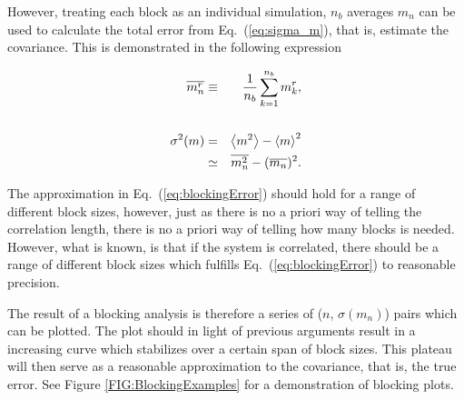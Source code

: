 However, treating each block as an individual simulation, $n_b$ averages $m_n$ can be used to calculate the total error from Eq.~(\ref{eq:sigma_m}), that is, estimate the covariance. This is demonstrated in the following expression

\begin{eqnarray}
  \overline{m_n^r} &\equiv& \frac{1}{n_b}\sum_{k=1}^{n_b} m_k^r, \\
\nonumber\\
  \sigma^2(m) &=& \left< m^2 \right> - \left< m \right>^2 \nonumber\\
              &\simeq& \overline{m_n^2} - (\overline{m_n})^2. \label{eq:blockingError}
\end{eqnarray}

The approximation in Eq.~(\ref{eq:blockingError}) should hold for a range of different block sizes, however, just as there is no a priori way of telling the correlation length, there is no a priori way of telling how many blocks is needed. However, what is known, is that if the system is correlated, there should be a range of different block sizes which fulfills Eq.~(\ref{eq:blockingError}) to reasonable precision. 

The result of a blocking analysis is therefore a series of ($n$, $\sigma(m_n)$) pairs which can be plotted. The plot should in light of previous arguments result in a increasing curve which stabilizes over a certain span of block sizes. This plateau will then serve as a reasonable approximation to the covariance, that is, the true error. See Figure \ref{FIG:BlockingExamples} for a demonstration of blocking plots.

